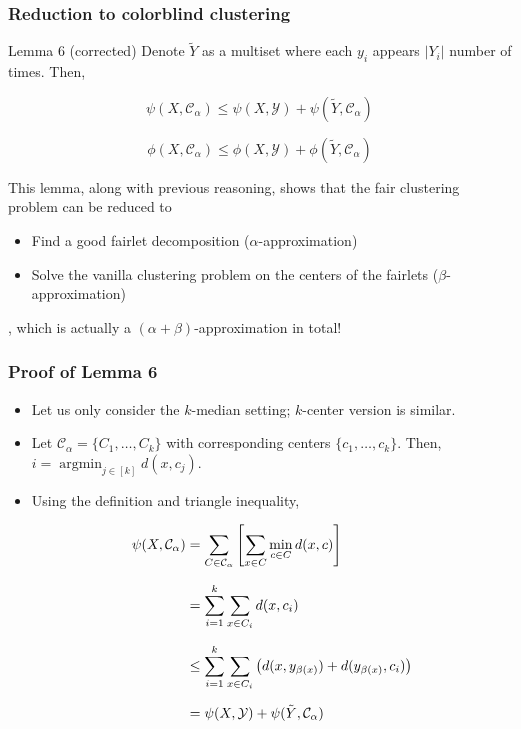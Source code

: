 \documentclass{beamer}
\DeclareMathOperator{\argmin}{argmin}
\begin{document}


\begin{frame}
\frametitle{Reduction to colorblind clustering}

\begin{block}{Lemma 6 (corrected)}
Denote $\tilde{Y}$ as a multiset where each $y_i$ appears $|Y_i|$ number of times. Then,

$$\psi(X, \mathcal{C}_\alpha) \leq \psi(X, \mathcal{Y}) + \psi(\tilde{Y}, \mathcal{C}_\alpha)$$

$$\phi(X, \mathcal{C}_\alpha) \leq \phi(X, \mathcal{Y}) + \phi(\tilde{Y}, \mathcal{C}_\alpha)$$

\end{block} \pause

This lemma, along with previous reasoning, shows that the fair clustering problem can be reduced to
\begin{itemize}
	\item Find a good fairlet decomposition ($\alpha$-approximation)
	\item Solve the vanilla clustering problem on the centers of the fairlets ($\beta$-approximation)
\end{itemize}
, which is actually a $(\alpha + \beta)$-approximation in total!

\end{frame}



\begin{frame}
\frametitle{Proof of Lemma 6}

\begin{itemize}
	\item Let us only consider the $k$-median setting; $k$-center version is similar.
	
	\item Let $\mathcal{C}_\alpha = \{ C_1, \dots, C_k \}$ with corresponding centers $\{ c_1, \dots, c_k \}$. Then, $i = \argmin_{j \in [k]} d(x, c_j)$.
	
	\item Using the definition and triangle inequality,
	
	\begin{equation*}
\setlength{\jot}{10pt}
   \begin{aligned}
         \psi(X, \mathcal{C}_\alpha) & = \sum_{C \in \mathcal{C_\alpha}} \left[ \sum_{x \in C} \min_{c \in C} d(x, c) \right] \\
	& = \sum_{i = 1}^k \sum_{x \in C_i} d(x, c_i) \\
	& \leq \sum_{i = 1}^k \sum_{x \in C_i} \left( d(x, y_{\beta(x)}) + d(y_{\beta(x)}, c_i) \right) \\
	& = \psi(X, \mathcal{Y}) + \psi(\tilde{Y}, \mathcal{C}_\alpha)
    \end{aligned}
	\end{equation*}
	
\end{itemize}

\end{frame}
\end{document}
